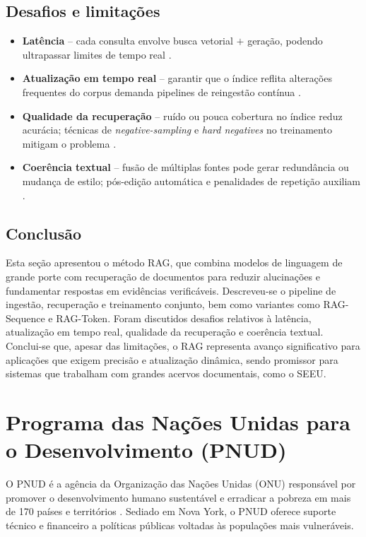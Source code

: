 \subsection{Desafios e limitações}
\begin{itemize}
  \item \textbf{Latência} – cada consulta envolve busca vetorial $+$ geração,
        podendo ultrapassar limites de tempo real
        \cite{scalable2025overload}.
  \item \textbf{Atualização em tempo real} – garantir que o índice reflita
        alterações frequentes do corpus demanda pipelines de reingestão
        contínua \cite{taipalus2024vector}.
  \item \textbf{Qualidade da recuperação} – ruído ou pouca cobertura no índice
        reduz acurácia; técnicas de \textit{negative-sampling} e \textit{hard
        negatives} no treinamento mitigam o problema
        \cite{gao2023survey,salemi2024hallucination}.
  \item \textbf{Coerência textual} – fusão de múltiplas fontes pode gerar
        redundância ou mudança de estilo; pós-edição automática e
        penalidades de repetição auxiliam \cite{zhang2025fine}.
\end{itemize}

\subsection{Conclusão}
Esta seção apresentou o método RAG, que combina modelos de linguagem de grande porte com recuperação de documentos para reduzir alucinações e fundamentar respostas em evidências verificáveis. Descreveu-se o pipeline de ingestão, recuperação e treinamento conjunto, bem como variantes como RAG-Sequence e RAG-Token. Foram discutidos desafios relativos à latência, atualização em tempo real, qualidade da recuperação e coerência textual. Conclui-se que, apesar das limitações, o RAG representa avanço significativo para aplicações que exigem precisão e atualização dinâmica, sendo promissor para sistemas que trabalham com grandes acervos documentais, como o SEEU.

\section{Programa das Nações Unidas para o Desenvolvimento (PNUD)}
\label{sec:pnud}

O PNUD é a agência da Organização das Nações Unidas (ONU) responsável por promover o desenvolvimento
humano sustentável e erradicar a pobreza em mais de 170 países e territórios
\cite{undp2025sobre,undp2025onu}. Sediado em Nova York, o PNUD oferece suporte
técnico e financeiro a políticas públicas voltadas às populações mais
vulneráveis.


